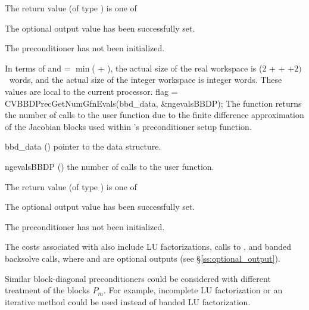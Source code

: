 {
  The return value  (of type ) is one of
  \begin{args}
  \item[\Id{CV\_SUCCESS}] 
    The optional output value has been successfully set.
  \item[\Id{CV\_PDATA\_NULL}]
    The {\cvbbdpre} preconditioner has not been initialized.
  \end{args}
}
{
  In terms of  and
   = $\min$( $+$ ),
  the actual size of the real workspace is
  (2  $+$  $+$  $+2) \, $ $~$
   words, and the actual size of the integer workspace is
   integer words.  These values are local to the current processor.
}
{
  flag = CVBBDPrecGetNumGfnEvals(bbd\_data, \&ngevalsBBDP);
}
{
  The function  returns the
  number of calls to the user  function due to the 
  finite difference approximation of the Jacobian blocks used within
  {\cvbbdpre}'s preconditioner setup function.
}
{
  \begin{args}[ngevalsBBDP]
  \item[bbd\_data] ()
    pointer to the {\cvbbdpre} data structure.
  \item[ngevalsBBDP] ()
    the number of calls to the user  function.
  \end{args}
}
{
  The return value  (of type ) is one of
  \begin{args}
  \item[\Id{CV\_SUCCESS}] 
    The optional output value has been successfully set.
  \item[\Id{CV\_PDATA\_NULL}]
    The {\cvbbdpre} preconditioner has not been initialized.
  \end{args}
}
{}

The costs associated with {\cvbbdpre} also include  LU
factorizations,  calls to , and  banded
backsolve calls, where  and  are optional {\cvode}
outputs (see \S\ref{ss:optional_output}).

Similar block-diagonal preconditioners could be considered with different
treatment of the blocks $P_m$. For example, incomplete LU factorization or
an iterative method could be used instead of banded LU factorization.

